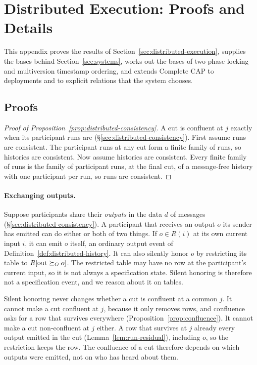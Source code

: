 \section{Distributed Execution: Proofs and Details}
\label{app:proofs-sec4}

This appendix proves the results of Section~\ref{sec:distributed-execution}, supplies the
\commitment bases behind Section~\ref{sec:systems}, works out the bases of two-phase
locking and multiversion timestamp ordering, and extends Complete CAP to deployments and
to explicit relations that the system chooses.

\subsection{Proofs}

\begin{proof}[Proof of Proposition~\ref{prop:distributed-consistency}]
A cut is confluent at $j$ exactly when its participant runs are
(\S\ref{sec:distributed-consistency}).  First assume runs are consistent.  The
participant runs at any cut form a finite family of runs, so histories are
consistent.  Now assume histories are consistent.  Every finite family of runs
is the family of participant runs, at the final cut, of a message-free history
with one participant per run, so runs are consistent.
\end{proof}

\paragraph{Exchanging outputs.}
\label{app:exchanging-outputs}
Suppose participants share their \emph{outputs} in the data $d$ of messages
(\S\ref{sec:distributed-consistency}).  A participant that receives an
output $o$ its sender has emitted can do either or both of two things.  If
$o\in R(i)$ at its own current input $i$, it can emit $o$ itself, an ordinary
output event of Definition~\ref{def:distributed-history}.  It can also
silently honor $o$ by restricting its table to $R[\mathrm{out}\succeq_O o]$.
The restricted table may have no row at the participant's current input, so it
is not always a specification state.  Silent honoring is therefore not a
specification event, and we reason about it on tables.

Silent honoring never changes whether a cut is confluent at a common \indesc
$j$.  It cannot make a cut confluent at $j$, because it only removes rows, and
confluence asks for a row that survives everywhere
(Proposition~\ref{prop:confluence}).  It cannot make a cut non-confluent at
$j$ either.  A row that survives at $j$ already
\outrel every output emitted in the cut (Lemma~\ref{lem:run-residual}),
including $o$, so the restriction keeps the row.  The confluence of a cut
therefore depends on which outputs were emitted, not on who has heard about
them.

